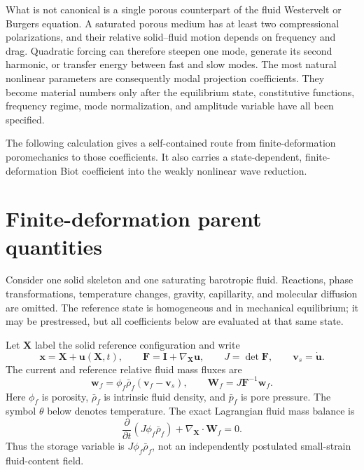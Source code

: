 \documentclass[11pt]{article}
\newcommand{\mbf}[1]{\mathbf{#1}}
\begin{document}
What is not canonical is a single porous counterpart of the fluid
Westervelt or Burgers equation.  A saturated porous medium has at least two
compressional polarizations, and their relative solid--fluid motion depends on
frequency and drag.  Quadratic forcing can therefore steepen one mode, generate
its second harmonic, or transfer energy between fast and slow modes.  The most
natural nonlinear parameters are consequently modal projection coefficients.
They become material numbers only after the equilibrium state, constitutive
functions, frequency regime, mode normalization, and amplitude variable have
all been specified.

The following calculation gives a self-contained route from
finite-deformation poromechanics to those coefficients.  It also carries a
state-dependent, finite-deformation Biot coefficient into the weakly nonlinear
wave reduction.

\section{Finite-deformation parent quantities}

Consider one solid skeleton and one saturating barotropic fluid.  Reactions,
phase transformations, temperature changes, gravity, capillarity, and molecular
diffusion are omitted.  The reference state is homogeneous and in mechanical
equilibrium; it may be prestressed, but all coefficients below are evaluated at
that same state.

Let \(\mbf X\) label the solid reference configuration and write
\begin{equation}
    \mbf x=\mbf X+\mbf u(\mbf X,t),
    \qquad
    \mbf F=\mbf I+\nabla_{\mbf X}\mbf u,
    \qquad
    J=\det\mbf F,
    \qquad
    \mbf v_s=\dot{\mbf u}.
    \label{eq:solid_kinematics}
\end{equation}
The current and reference relative fluid mass fluxes are
\begin{equation}
    \mbf w_f
    =\phi_f\bar\rho_f\left(\mbf v_f-\mbf v_s\right),
    \qquad
    \mbf W_f=J\mbf F^{-1}\mbf w_f.
    \label{eq:relative_mass_fluxes}
\end{equation}
Here \(\phi_f\) is porosity, \(\bar\rho_f\) is intrinsic fluid density,
and \(\bar p_f\) is pore pressure.  The symbol \(\theta\) below denotes
temperature.  The exact Lagrangian fluid mass balance is
\begin{equation}
    \frac{\partial}{\partial t}
    \left(J\phi_f\bar\rho_f\right)
    +\nabla_{\mbf X}\cdot\mbf W_f=0.
    \label{eq:exact_lagrangian_mass}
\end{equation}
Thus the storage variable is \(J\phi_f\bar\rho_f\), not an independently
postulated small-strain fluid-content field.
\end{document}
